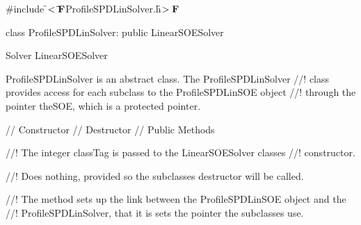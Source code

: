 

\indent \#include \f$<\tilde{ }{\bf F}$ProfileSPDLinSolver.h\f$>{\bf F}$

\indent class ProfileSPDLinSolver: public LinearSOESolver

\indent  Solver
\indent\indent LinearSOESolver
\indent\indent{}

\indent ProfileSPDLinSolver is an abstract class.  The ProfileSPDLinSolver
//! class provides access for each subclass to the ProfileSPDLinSOE object
//! through the pointer \p theSOE, which is a protected pointer.

\indent\indent // Constructor
\indent{}
\indent\indent // Destructor
\indent{}
\indent\indent // Public Methods
\indent{}

//! The integer \p classTag is passed to the LinearSOESolver classes
//! constructor. 

//! Does nothing, provided so the subclasses destructor will be called.

//! The method sets up the link between the ProfileSPDLinSOE object and the
//! ProfileSPDLinSolver, that it is sets the pointer the subclasses use.
